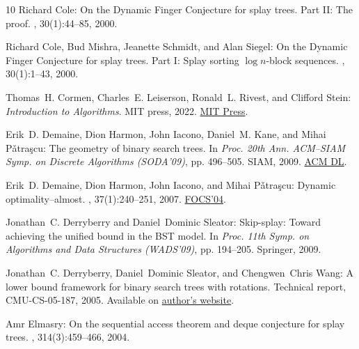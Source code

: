 \documentclass[11pt]{article}
\numberwithin{equation}{section}
\theoremstyle{definition}
\theoremstyle{plain}
\begin{document}
\begin{thebibliography}{10}
{\sc Richard Cole}: {On the Dynamic Finger Conjecture for splay trees. Part II:
  The proof}.
, 30(1):44--85, 2000.
\newblock [\epfmtdoi{10.1137/S009753979732699X}]

{\sc Richard Cole, Bud Mishra, Jeanette Schmidt, and Alan Siegel}: {On the
  Dynamic Finger Conjecture for splay trees. Part I: Splay} sorting $\log
  n$-block sequences.
, 30(1):1--43, 2000.
\newblock [\epfmtdoi{10.1137/S0097539797326988}]

{\sc Thomas~H. Cormen, Charles~E. Leiserson, Ronald~L. Rivest, and Clifford
  Stein}: {\em Introduction to Algorithms}.
\newblock MIT press, 2022.
\newblock
  \href{http://mitpress.mit.edu/9780262046305/introduction-to-algorithms}{MIT
  Press}.

{\sc Erik~D. Demaine, Dion Harmon, John Iacono, Daniel~M. Kane, and Mihai
  {P\v{a}tra\c{s}cu}}: The geometry of binary search trees.
\newblock In {\em Proc. 20th Ann. ACM--SIAM Symp. on Discrete Algorithms
  (SODA'09)}, pp. 496--505. SIAM, 2009.
\newblock \href{https://dl.acm.org/doi/10.5555/1496770.1496825}{ACM DL}.

{\sc Erik~D. Demaine, Dion Harmon, John Iacono, and Mihai {P\v{a}tra\c{s}cu}}:
  Dynamic optimality--almost.
, 37(1):240--251, 2007.
\newblock \prelim \href{https://doi.org/10.1109/FOCS.2004.23}{FOCS'04}.
\newblock [\epfmtdoi{10.1137/S0097539705447347}]

{\sc Jonathan~C. Derryberry and Daniel~Dominic Sleator}: Skip-splay: {T}oward
  achieving the unified bound in the {BST} model.
\newblock In {\em Proc. 11th Symp. on Algorithms and Data Structures
  (WADS'09)}, pp. 194--205. Springer, 2009.
\newblock [\epfmtdoi{10.1007/978-3-642-03367-4\_18}]

{\sc Jonathan~C. Derryberry, Daniel~Dominic Sleator, and Chengwen~Chris Wang}:
  A lower bound framework for binary search trees with rotations.
\newblock Technical report, CMU-CS-05-187, 2005.
\newblock Available on
  \href{https://www.cs.cmu.edu/~jonderry/lower-bound.pdf}{author's website}.

{\sc Amr Elmasry}: On the sequential access theorem and deque conjecture for
  splay trees.
, 314(3):459--466, 2004.


\end{thebibliography}
\end{document}
